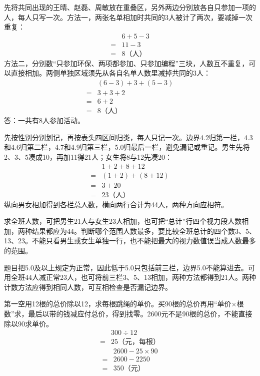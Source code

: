 \documentclass[multi=snippet,border=0pt]{standalone}
\newenvironment{snippet}[3]{\begin{minipage}{#1bp}\color{answerred}\fontsize{#2}{#3}\selectfont\raggedright}{\end{minipage}}
\begin{document}
\begin{snippet}{505}{11.5}{14}先将共同出现的王晴、赵磊、周敏放在重叠区，另外两边分别放各自只参加一项的人，每人只写一次。方法一，两张名单相加时共同的3人被计了两次，要减掉一次重复：\[\begin{aligned}&6+5-3\\={}&11-3\\={}&8\text{（人）}\end{aligned}\]方法二，分别数“只参加环保、两项都参加、只参加编程”三块，人数互不重复，可以直接相加。两侧单独区域须先从各自名单人数里减掉共同的3人：\[\begin{aligned}&(6-3)+3+(5-3)\\={}&3+3+2\\={}&6+2\\={}&8\text{（人）}\end{aligned}\]答：一共有8人参加活动。\end{snippet}
\begin{snippet}{505}{11.5}{14}先按性别分别划记，再按表头四区间归类，每人只记一次。边界4.2归第一栏，4.3和4.6归第二栏，4.7和4.9归第三栏，5.0归最后一栏，避免漏记或重记。男生先将2、3、5凑成10，再加11得21人；女生将8与12先凑20：\[\begin{aligned}&1+2+8+12\\={}&(1+2)+(8+12)\\={}&3+20\\={}&23\text{（人）}\end{aligned}\]纵向男女相加得到各栏总人数，横向两行合计为44人，两种方向应相符。\end{snippet}
\begin{snippet}{505}{11.5}{14}求全班人数，可把男生21人与女生23人相加，也可把“总计”行四个视力段人数相加，两种结果都应为44。判断哪个范围人数最多，要比较全班总计的四个数3、5、13、23。不能只看男生或女生单独一行，也不能把最大的视力数值误当成人数最多的范围。\end{snippet}
\begin{snippet}{505}{11.5}{14}题目把5.0及以上规定为正常，因此低于5.0只包括前三栏，边界5.0不能算进去。可用全班44人减正常23人，也可将前三栏3、5、13相加，两种方法都得到21人。两种计数方法应得到相同人数，可互相检查是否漏记边界。\end{snippet}
\begin{snippet}{505}{11.5}{14}第一空用12根的总价除以12，求每根跳绳的单价。买90根的总价再用“单价×根数”求，最后以带的钱减应付总价，得到找零。2600元不是90根的总价，不能直接除以90求单价。\[\begin{aligned}&300\div12\\={}&25\text{（元，每根）}\end{aligned}\]\[\begin{aligned}&2600-25\times90\\={}&2600-2250\\={}&350\text{（元）}\end{aligned}\]\end{snippet}
\end{document}
